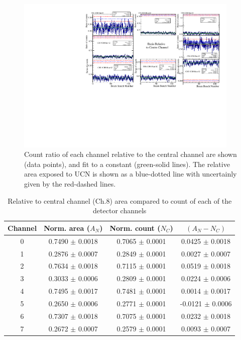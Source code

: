 \documentclass[twocolumn]{bmcart}
\begin{document}
\begin{figure}[!htpb]
\centering
\includegraphics[width=0.95\textwidth]{figures/relratios.pdf}
\caption{ Count ratio of each channel relative to the central channel
  are shown (data points), and fit to a constant (green-solid lines).
  The relative area exposed to UCN is shown as a blue-dotted line with
  uncertainly given by the red-dashed lines.}
\label{fig:relratios}
\end{figure}

\begin{table}[ht]
  \caption{Relative to central channel (Ch.8) area compared to count of each of the detector channels}
  \centering
  \begin{tabular}{c | c c | c}
    \hline \hline
 Channel  & Norm. area ($A_N$)  & Norm. count ($N_C$)  &     $( A_N - N_C )$ \\    
    \hline 
    0  &      0.7490 $\pm$   0.0018   &    0.7065 $\pm$   0.0001    &        0.0425 $\pm$   0.0018\\
    1  &      0.2876 $\pm$   0.0007   &    0.2849 $\pm$   0.0001    &        0.0027 $\pm$   0.0007\\
    2  &      0.7634 $\pm$   0.0018   &    0.7115 $\pm$   0.0001    &        0.0519 $\pm$   0.0018\\
    3  &      0.3033 $\pm$   0.0006   &    0.2809 $\pm$   0.0001    &        0.0224 $\pm$   0.0006\\
    4  &      0.7495 $\pm$   0.0017   &    0.7481 $\pm$   0.0001    &        0.0014 $\pm$   0.0017\\
    5  &      0.2650 $\pm$   0.0006   &    0.2771 $\pm$   0.0001    &       -0.0121 $\pm$   0.0006\\
    6  &      0.7307 $\pm$   0.0018   &    0.7075 $\pm$   0.0001    &        0.0232 $\pm$   0.0018\\
    7  &      0.2672 $\pm$   0.0007   &    0.2579 $\pm$   0.0001    &        0.0093 $\pm$   0.0007\\
    \hline
  \end{tabular}
\label{tab:relrates}
\end{table}
\end{document}
